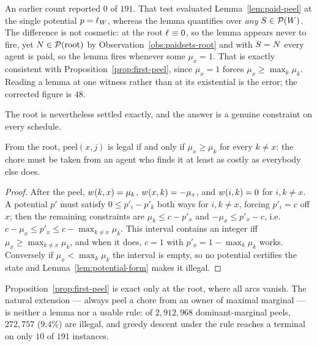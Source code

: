 \begin{remark}
\label{rem:potential-free-choice}
An earlier count reported $0$ of $191$. That test evaluated
Lemma~\ref{lem:paid-peel} at the single potential $p = \ell_{W}$,
whereas the lemma quantifies over \emph{any} $S \in \mathcal{P}(W)$. The
difference is not cosmetic: at the root $\ell_{} \equiv 0$, so the lemma appears
never to fire, yet $N \in \mathcal{P}(\text{root})$ by
Observation~\ref{obs:paidsets-root} and with $S = N$ every agent is paid, so
the lemma fires whenever some $\mu_x = 1$. That is exactly consistent with
Proposition~\ref{prop:first-peel}, since $\mu_x = 1$ forces
$\mu_x \ge \max_k \mu_k$. Reading a lemma at one witness rather than at its
existential is the error; the corrected figure is $48$.
\end{remark}

The root is nevertheless settled exactly, and the answer is a genuine constraint
on every schedule.

\begin{proposition}
\label{prop:first-peel}
From the root, $\mathrm{peel}(x,j)$ is legal if and only if
$\mu_x \ge \mu_k$ for every $k \ne x$: the chore must be taken from an agent who
finds it at least as costly as everybody else does.
\end{proposition}

\begin{proof}
After the peel, $w_{}(k,x) = \mu_k$, $w_{}(x,k) = -\mu_x$, and
$w_{}(i,k) = 0$ for $i,k \ne x$. A potential $p'$ must satisfy
$0 \le p'_i - p'_k$ both ways for $i,k \ne x$, forcing $p'_i = c$ off $x$; then
the remaining constraints are $\mu_k \le c - p'_x$ and $-\mu_x \le p'_x - c$,
i.e.\ $c - \mu_x \le p'_x \le c - \max_{k \ne x} \mu_k$. This interval contains an
integer iff $\mu_x \ge \max_{k \ne x} \mu_k$, and when it does, $c = 1$ with
$p'_x = 1 - \max_k \mu_k$ works. Conversely if $\mu_x < \max_k \mu_k$ the
interval is empty, so no potential certifies the state and
Lemma~\ref{lem:potential-form} makes it illegal.
\end{proof}

\begin{remark}
\label{rem:dominant-marginal-fails}
Proposition~\ref{prop:first-peel} is exact only at the root, where all arcs
vanish. The natural extension --- always peel a chore from an owner of maximal
marginal --- is neither a lemma nor a usable rule: of $2{,}912{,}968$
dominant-marginal peels, $272{,}757$ ($9.4\%$) are illegal, and greedy descent
under the rule reaches a terminal on only $10$ of $191$ instances.
\end{remark}

